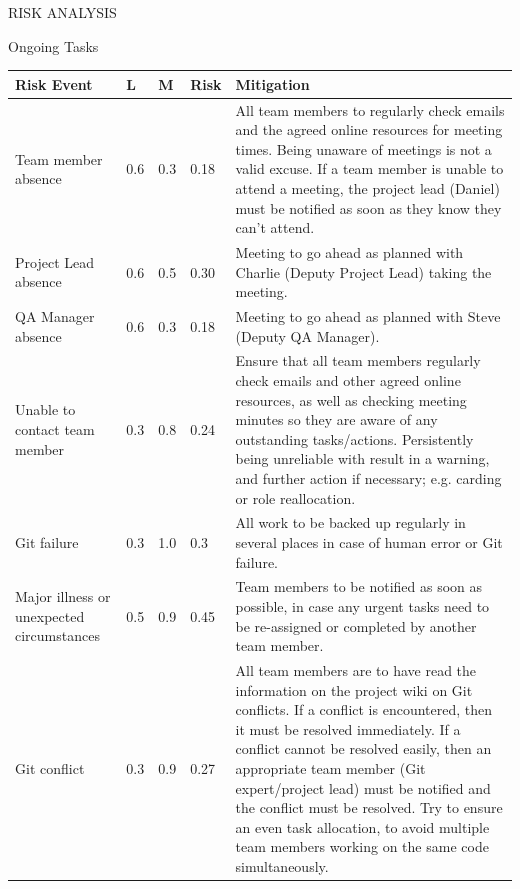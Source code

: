 \documentclass{article}
\begin{document}
	\newpage
	\begin{section}{RISK ANALYSIS}
		\begin{subsection}{Ongoing Tasks}
			\begin{tabularx}{\linewidth}{| p{3.5cm} | p{0.5cm} | p{0.5cm} | p{0.8cm} | X |}
				\hline
				\bf{Risk Event} & \bf{L} & \bf{M} & \bf{Risk} & \bf{Mitigation} \\
				\hline
				Team member absence & 0.6 & 0.3 & 0.18 & All team members to regularly check emails and the agreed online resources for meeting times. Being unaware of meetings is not a valid excuse. If a team member is unable to attend a meeting, the project lead (Daniel) must be notified as soon as they know they can't attend. \\
				\hline
				Project Lead absence & 0.6 & 0.5 & 0.30 & Meeting to go ahead as planned with Charlie (Deputy Project Lead) taking the meeting. \\
				\hline
				QA Manager absence & 0.6 & 0.3 & 0.18 & Meeting to go ahead as planned with Steve (Deputy QA Manager). \\
				\hline
				Unable to contact team member & 0.3 & 0.8 & 0.24 & Ensure that all team members regularly check emails and other agreed online resources, as well as checking meeting minutes so they are aware of any outstanding tasks/actions. Persistently being unreliable with result in a warning, and further action if necessary; e.g. carding or role reallocation. \\
				\hline
				Git failure & 0.3 & 1.0 & 0.3 & All work to be backed up regularly in several places in case of human error or Git failure. \\
				\hline
				Major illness or unexpected circumstances & 0.5 & 0.9 & 0.45 & Team members to be notified as soon as possible, in case any urgent tasks need to be re-assigned or completed by another team member. \\
				\hline
				Git conflict & 0.3 & 0.9 & 0.27 & All team members are to have read the information on the project wiki on Git conflicts. If a conflict is encountered, then it must be resolved immediately. If a conflict cannot be resolved easily, then an appropriate team member (Git expert/project lead) must be notified and the conflict must be resolved. Try to ensure an even task allocation, to avoid multiple team members working on the same code simultaneously. \\
				\hline
			\end{tabularx}
		\end{subsection}
		

\end{section}
\end{document}
